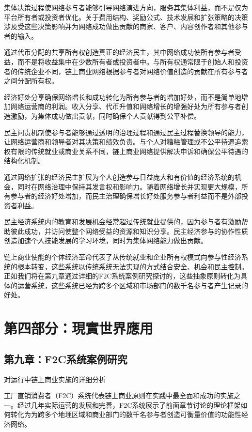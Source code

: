 \documentclass[
  Letterpaper,
]{scrbook}
\begin{document}
集体决策过程使网络参与者能够引导网络演进方向，服务其集体利益，而不是仅为平台所有者或投资者优化。关于费用结构、奖励公式、技术发展和扩张策略的决策涉及受这些决策影响并为网络成功做出贡献的商家、客户、内容创作者和其他参与者的输入。

通过代币分配的共享所有权创造真正的经济民主，其中网络成功使所有参与者受益，而不是将收益集中在少数所有者或投资者中。与所有权通常限于创始人和投资者的传统企业不同，链上商业网络根据参与者对网络价值创造的贡献在所有参与者之间分配所有权。

经济好处分享确保网络增长和成功转化为所有参与者的增加好处，而不是简单地增加网络运营商的利润。收入分享、代币升值和网络增长的增强好处为所有参与者创造激励，为集体成功做出贡献，同时确保个人贡献得到公平补偿。

民主问责机制使参与者能够通过透明的治理过程和通过民主过程替换领导的能力，让网络运营商和领导者对其决策和绩效负责。与个人对糟糕管理或不公平待遇追索权有限的传统就业或商业关系不同，链上商业网络提供解决申诉和确保公平待遇的结构化机制。

通过网络扩张的经济民主扩展为个人创造参与日益庞大和有价值的经济系统的机会，同时在网络治理中保持其发言权和影响力。随着网络增长并实现更大规模，所有参与者的经济好处增加，而民主治理确保增长好处服务参与者利益而不是外部投资者利益。

民主经济系统内的教育和发展机会经常超过传统就业提供的，因为参与者有激励帮助彼此成功，并访问使整个网络受益的资源和知识分享。民主经济参与的协作性质创造加速个人技能发展的学习环境，同时为集体网络能力做出贡献。

链上商业使能的个体经济革命代表了从传统就业和企业所有权模式向参与性经济系统的根本转变，这些系统以传统系统无法实现的方式结合安全、机会和民主控制。正如我们将在第九章通过详细的F2C系统案例研究探讨的，这些抽象原则转化为具体的运营系统，这些系统已经为跨多个区域和市场部门的数千名参与者产生记录的好处。

\part{第四部分：現實世界應用}

\chapter{第九章：F2C系统案例研究}\label{sec-f2c-case-study}

对运行中链上商业实施的详细分析

工厂直销消费者（F2C）系统代表链上商业原则在实践中最全面和成功的实施之一。经过几年实际运营的发展和完善，F2C系统展示了前面章节讨论的理论框架如何转化为为跨多个地理区域和商业部门的数千名参与者创造可衡量价值的功能性经济网络。
\end{document}
